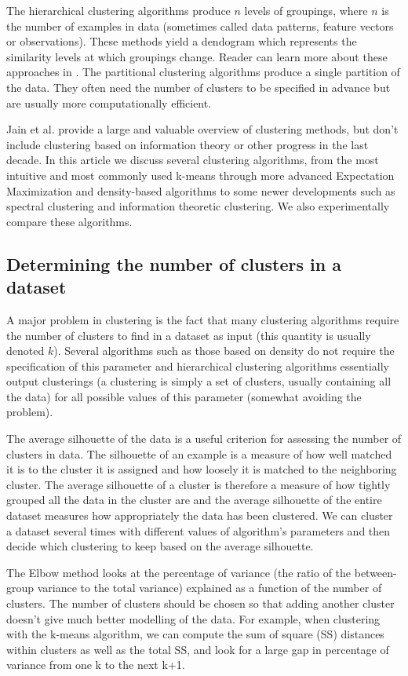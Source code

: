 \documentclass[conference]{IEEEtran}
\begin{document}
The hierarchical clustering algorithms produce $n$ levels of groupings, where $n$ is
the number of examples in data (sometimes called data patterns, feature vectors or observations). These
methods yield a dendogram which represents the similarity levels at which groupings change.
Reader can learn more about these approaches in \cite{kononenko07}. The partitional
clustering algorithms produce a single partition of the data. They often need the number of clusters
to be specified in advance but are usually more computationally efficient.

Jain et al. \cite{jain99} provide a large and valuable overview of clustering methods,
but don't include clustering based on information theory or other progress in the last decade.
In this article we discuss several clustering algorithms, from the most intuitive and most commonly
used k-means through more advanced Expectation Maximization and density-based algorithms
to some newer developments such as spectral clustering and information theoretic clustering.
We also experimentally compare these algorithms.

\subsection{Determining the number of clusters in a dataset}
A major problem in clustering is the fact that many clustering algorithms require the
number of clusters to find in a dataset as input (this quantity is usually denoted $k$).
Several algorithms such as those based on density do not require the specification of this
parameter and hierarchical clustering algorithms essentially output clusterings (a clustering
is simply a set of clusters, usually containing all the data)
for all possible values of this parameter (somewhat avoiding the problem).

The average silhouette of the data is a useful criterion for assessing the number of clusters in data.
The silhouette of an example is a measure of how well matched it is to the cluster it is assigned
and how loosely it is matched to the neighboring cluster. The average silhouette of a cluster
is therefore a measure of how tightly grouped all the data in the cluster are and the average silhouette of
the entire dataset measures how appropriately the data has been clustered. We can cluster a dataset
several times with different values of algorithm's parameters and then decide which clustering to keep based on
the average silhouette.

The Elbow method looks at the percentage of variance (the ratio of the between-group variance
to the total variance) explained as a function of the number of clusters.
The number of clusters should be chosen so that adding another cluster doesn't give much better modelling
of the data. For example, when clustering with the k-means algorithm, we can compute the sum of square (SS)
distances within clusters as well as the total SS, and look for a large gap in percentage of variance
from one k to the next k+1.
\end{document}
